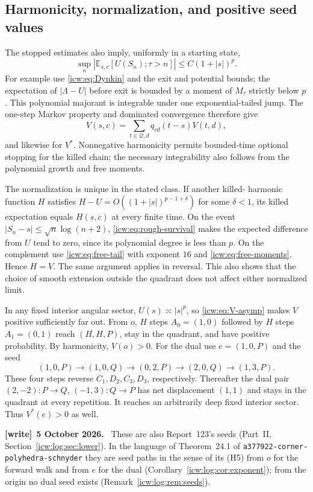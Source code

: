 \documentclass[11pt,letterpaper]{article}
\theoremstyle{remark}\newtheorem{remark}[theorem]{Remark}
\newcommand{\E}{\mathbb E}
\newcommand{\Qd}{\mathcal Q}
\newcommand{\1}{\mathbf1}
\newenvironment{writenote}[1][]{\par\smallskip\begingroup\small
 \noindent\textbf{[write]}\if\relax\detokenize{#1}\relax\else~\textbf{#1.}\fi\ }%
 {\par\endgroup\smallskip}
\newcommand{\file}[1]{\textup{\nolinkurl{#1}}}
\begin{document}
\subsection{Harmonicity, normalization, and positive seed values}\label{icw:sub:seeds}
The stopped estimates also imply, uniformly in a starting state,
\[
 \sup_n\left|\E_{s,c}[U(S_n);\tau>n]\right|
 \le C(1+|s|)^p.
\]
For example use \eqref{icw:eq:Dynkin} and the exit and potential bounds;
the expectation of $|\Lambda-U|$ before exit is bounded by a moment
of $M_\tau$ strictly below $p$. This polynomial majorant is integrable
under one exponential-tailed jump. The one-step Markov property and
dominated convergence therefore give
\begin{equation}\label{icw:eq:harmonic}
 V(s,c)=\sum_{t\in\Qd,d}q_{cd}(t-s)V(t,d),
\end{equation}
and likewise for $V^*$. Nonnegative harmonicity permits bounded-time
optional stopping for the killed chain; the necessary integrability
also follows from the polynomial growth and free moments.

The normalization is unique in the stated class. If another killed-
harmonic function $H$ satisfies
$H-U=O((1+|s|)^{p-1+\delta})$ for some $\delta<1$, its killed
expectation equals $H(s,c)$ at every finite time. On the event
$|S_n-s|\le\sqrt n\log(n+2)$, \eqref{icw:eq:rough-survival} makes the
expected difference from $U$ tend to zero, since its polynomial degree
is less than $p$. On the complement use \eqref{icw:eq:free-tail} with
exponent $16$ and \eqref{icw:eq:free-moments}. Hence $H=V$. The same
argument applies in reversal. This also shows that the choice of smooth
extension outside the quadrant does not affect either normalized limit.

In any fixed interior angular sector, $U(s)\asymp|s|^p$, so
\eqref{icw:eq:V-asymp} makes $V$ positive sufficiently far out. From $o$,
$H$ steps $A_0=(1,0)$ followed by $H$ steps $A_1=(0,1)$ reach
$(H,H,P)$, stay in the quadrant, and have positive probability. By
harmonicity, $V(o)>0$. For the dual use $e=(1,0,P)$ and the seed
\begin{equation}\label{icw:eq:seed}
 (1,0,P)\to(1,0,Q)\to(0,2,P)\to(2,0,Q)\to(1,3,P).
\end{equation}
These four steps reverse $C_1,D_2,C_3,D_3$, respectively. Thereafter
the dual pair $(2,-2):P\to Q$, $(-1,3):Q\to P$ has net displacement
$(1,1)$ and stays in the quadrant at every repetition. It reaches an
arbitrarily deep fixed interior sector. Thus $V^*(e)>0$ as well.
\begin{writenote}[5 October 2026]
These are also Report~123's seeds (Part~II, Section~\ref{icw:log:sec:lower}). In the language of Theorem~24.1 of \file{a377922-corner-polyhedra-schnyder} they are seed paths in the sense of its (H5) from $o$ for the forward walk and from $e$ for the dual (Corollary~\ref{icw:log:cor:exponent}); from the origin no dual seed exists (Remark~\ref{icw:log:rem:seeds}).
\end{writenote}
\end{document}

